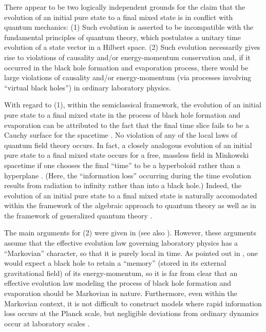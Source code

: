 \documentclass[12pt]{article}
\begin{document}
There appear to be two logically independent grounds for the claim
that the evolution of an initial pure state to a final mixed state is
in conflict with quantum mechanics: (1) Such evolution is asserted to
be incompatible with the fundamental principles of quantum theory,
which postulates a unitary time evolution of a state vector in a
Hilbert space. (2) Such evolution necessarily gives rise to violations
of causality and/or energy-momentum conservation and, if it occurred
in the black hole formation and evaporation process, there would be
large violations of causality and/or energy-momentum (via processes
involving ``virtual black holes'') in ordinary laboratory physics.

With regard to (1), within the semiclassical framework, the evolution
of an initial pure state to a final mixed state in the process of
black hole formation and evaporation can be attributed to the fact
that the final time slice fails to be a Cauchy surface for the
spacetime \cite{w4}. No violation of any of the local laws of quantum
field theory occurs. In fact, a closely analogous evolution of an
initial pure state to a final mixed state occurs for a free, massless
field in Minkowski spacetime if one chooses the final ``time'' to be a
hyperboloid rather than a hyperplane \cite{w4}. (Here, the
``information loss'' occurring during the time evolution results from
radiation to infinity rather than into a black hole.) Indeed, the
evolution of an initial pure state to a final mixed state is naturally
accomodated within the framework of the algebraic approach to quantum
theory \cite{w4} as well as in the framework of generalized quantum
theory \cite{ha}.

The main arguments for (2) were given in \cite{bps} (see also
\cite{ehns}). However, these arguments assume that the effective
evolution law governing laboratory physics has a ``Markovian''
character, so that it is purely local in time. As pointed out in
\cite{uw3}, one would expect a black hole to retain a ``memory''
(stored in its external gravitational field) of its energy-momentum,
so it is far from clear that an effective evolution law modeling the
process of black hole formation and evaporation should be Markovian in
nature. Furthermore, even within the Markovian context, it is not
difficult to construct models where rapid information loss occurs at
the Planck scale, but negligible deviations from ordinary dynamics
occur at laboratory scales \cite{uw3}.
\end{document}

